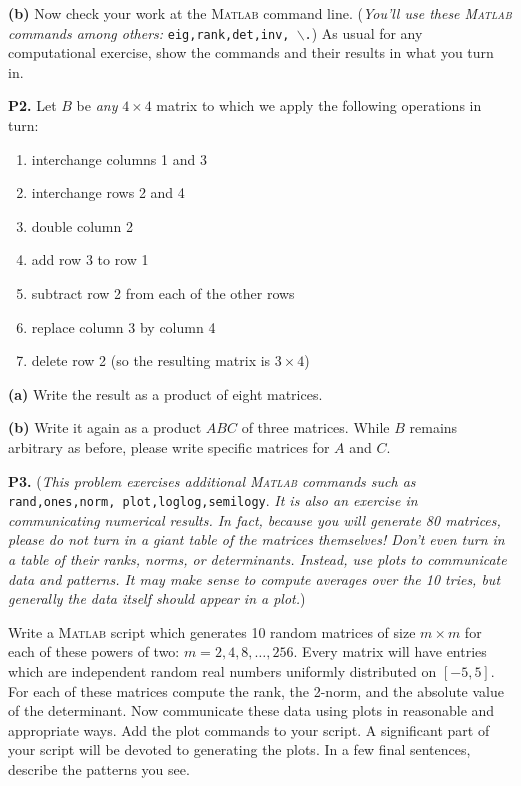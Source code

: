 \documentclass[12pt]{amsart}
\newcommand{\prob}[1]{\bigskip\noindent\textbf{#1.}\quad }
\newcommand{\epart}[1]{\medskip\noindent\textbf{(#1)}\quad }
\newcommand{\Matlab}{\textsc{Matlab}\xspace}
\begin{document}
\epart{b} Now check your work at the \Matlab command line.  (\emph{You'll use these \Matlab commands among others:} \texttt{eig,rank,det,inv,\,$\backslash$\;.})  As usual for any computational exercise, show the commands and their results in what you turn in.


\prob{P2} Let $B$ be \emph{any} $4\times 4$ matrix to which we apply the following operations in turn:
\renewcommand{\labelenumi}{\arabic{enumi}.}
\begin{enumerate}
\item interchange columns 1 and 3
\item interchange rows 2 and 4
\item double column 2
\item add row 3 to row 1
\item subtract row 2 from each of the other rows
\item replace column 3 by column 4
\item delete row 2 (so the resulting matrix is $3\times 4$)
\end{enumerate}

\epart{a} Write the result as a product of eight matrices.

\epart{b} Write it again as a product $ABC$ of three matrices.  While $B$ remains arbitrary as before, please write specific matrices for $A$ and $C$.


\prob{P3}  (\emph{This problem exercises additional \Matlab commands such as} \texttt{rand,ones,norm, plot,loglog,semilogy}. \emph{It is also an exercise in communicating numerical results.  In fact, because you will generate 80 matrices, please do \emph{not} turn in a giant table of the matrices themselves!  Don't even turn in a table of their ranks, norms, or determinants.  Instead, use plots to communicate data and patterns.  It may make sense to compute averages over the 10 tries, but generally the data itself should appear in a plot.})

Write a \Matlab script which generates 10 random matrices of size $m\times m$ for each of these powers of two: $m=2,4,8,\dots,256$.  Every matrix will have entries which are independent random real numbers uniformly distributed on $[-5,5]$.  For each of these matrices compute the rank, the 2-norm, and the absolute value of the determinant.  Now communicate these data using plots in reasonable and appropriate ways.  Add the plot commands to your script.  A significant part of your script will be devoted to generating the plots.  In a few final sentences, describe the patterns you see.
\end{document}
